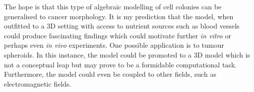 The hope is that this type of algebraic modelling of cell colonies 
can be generalised to cancer morphology. It is 
my prediction that the model, when outfitted 
to a 3D setting with access to nutrient sources such as blood 
vessels could produce fascinating findings which 
could motivate further \textit{in vitro} or perhaps even 
\textit{in vivo} experiments. One possible application is 
to tumour spheroids. In this instance, 
the model could be promoted to a 3D model which 
is not a conceptual leap but may prove to be 
a formidable computational task. Furthermore, the model could even 
be coupled to other fields,
such as electromagnetic fields. 